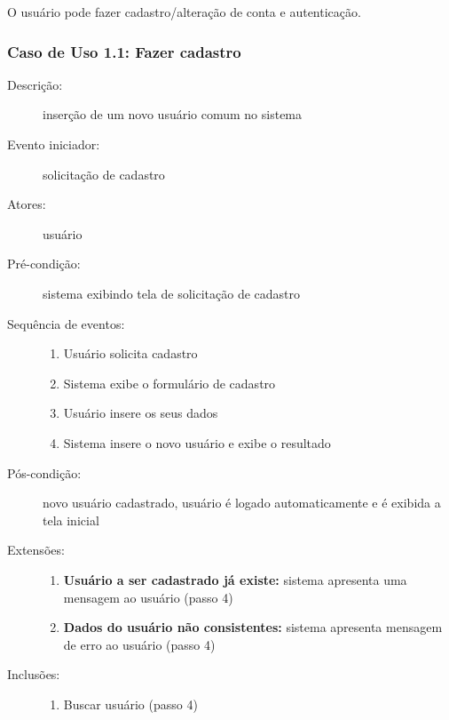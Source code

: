 O usuário pode fazer cadastro/alteração de conta e autenticação.

\subsubsection{Caso de Uso 1.1: Fazer cadastro}
\begin{description}
	\item[Descrição:] inserção de um novo usuário comum no sistema
	\item[Evento iniciador:] solicitação de cadastro
	\item[Atores:] usuário
	\item[Pré-condição:] sistema exibindo tela de solicitação de cadastro
	\item[Sequência de eventos:] \hfill
		\begin{enumerate}
			\item{Usuário solicita cadastro}
			\item{Sistema exibe o formulário de cadastro}
			\item{Usuário insere os seus dados}
			\item{Sistema insere o novo usuário e exibe o resultado}
		\end{enumerate}
	\item[Pós-condição:] novo usuário cadastrado, usuário é logado automaticamente e é exibida a tela inicial
	\item[Extensões:] \hfill
		\begin{enumerate}
			\item{\textbf{Usuário a ser cadastrado já existe:} sistema apresenta uma mensagem ao usuário (passo 4)}
			\item{\textbf{Dados do usuário não consistentes:} sistema apresenta mensagem de erro ao usuário (passo 4)}
		\end{enumerate}
	\item[Inclusões:] \hfill
		\begin{enumerate}
			\item{Buscar usuário (passo 4)}
		\end{enumerate}
\end{description}
%

